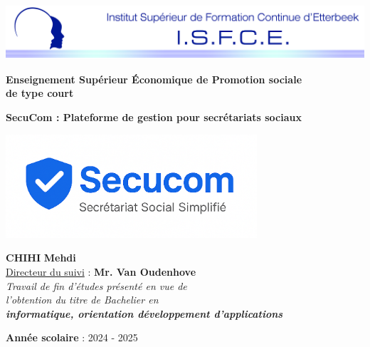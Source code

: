 \thispagestyle{empty}

\begin{center}
    \includegraphics[width=1\textwidth]{ISFCE_EnteteTFE.jpg}
\end{center}

\begin{center}
    \large\textbf{Enseignement Supérieur Économique de Promotion sociale\\de type court}
\end{center}

\vspace{2cm}

\begin{center}
    \huge\textbf{SecuCom : Plateforme de gestion pour secrétariats sociaux}
\end{center}

\vspace{0.5cm}

\begin{center}
    \includegraphics[width=0.7\textwidth]{secucomLogo.png}
\end{center}

\vspace{2cm}

\begin{flushright}
    \large
    \textbf{CHIHI} \textbf{Mehdi}\\
    \vspace{0.3cm}
    \underline{Directeur du suivi} :  \textbf{Mr. Van Oudenhove}\\
    \vspace{0.3cm}
    \textit{Travail de fin d'études présenté en vue de\\
    l'obtention du titre de Bachelier en\\
    \textbf{informatique, orientation développement d'applications}}
\end{flushright}

\begin{flushleft}
    \large
    \textbf{Année scolaire} : 2024 - 2025
\end{flushleft}
